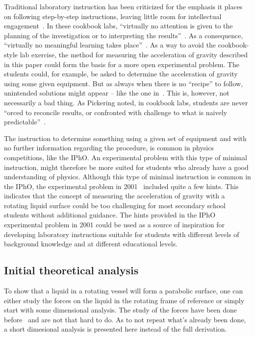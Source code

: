 \documentclass[11pt,
a4paper, 
swedish, english]{article}
\begin{document}
Traditional laboratory instruction has been criticized for the
emphasis it places on following step-by-step instructions, leaving
little room for intellectual engagement~\cite{Domin1999}. In these
cookbook labs, ``virtually no attention is given to the planning of
the investigation or to interpreting the
results''~\cite{Domin1999}. As a consequence, ``virtually no
meaningful learning takes place''~\cite{Domin1999}. As a way to avoid
the cookbook-style lab exercise, the method for measuring the
acceleration of gravity described in this paper could form the basis
for a more open experimental problem. The students could, for example,
be asked to determine the acceleration of gravity using some given
equipment. But as always when there is no ``recipe'' to follow,
unintended solutions might appear – like the one
in~\cite{IPhO2001}. This is, however, not necessarily a bad thing. As
Pickering noted, in cookbook labs, students are never ``orced to
reconcile results, or confronted with challenge to what is naively
predictable''~\cite{Domin1999}. 

The instruction to determine something using a given set of equipment
and with no further information regarding the procedure, is common in
physics competitions, like the IPhO. An experimental problem with this
type of minimal instruction, might therefore be more suited for
students who already have a good understanding of physics. Although
this type of minimal instruction is common in the IPhO, the
experimental problem in 2001~\cite{IPhO2001} included quite a few
hints. This indicates that the concept of measuring the acceleration
of gravity with a rotating liquid surface could be too challenging for
most secondary school students without additional guidance. The hints
provided in the IPhO experimental problem in 2001 could be used as a
source of inspiration for developing laboratory instructions suitable
for students with different levels of background knowledge and at
different educational levels. 



\subsection{Initial theoretical analysis}
To show that a liquid in a rotating vessel will form a parabolic
surface, one can either study the forces on the liquid in the rotating
frame of reference or simply start with some dimensional analysis. The
study of the forces have been done before~\cite{Sabatka2010, Berg1990}
and are not that hard to do. As to not repeat what's already been
done, a short dimesional analysis is presented here instead of the
full derivation. 
\end{document}
